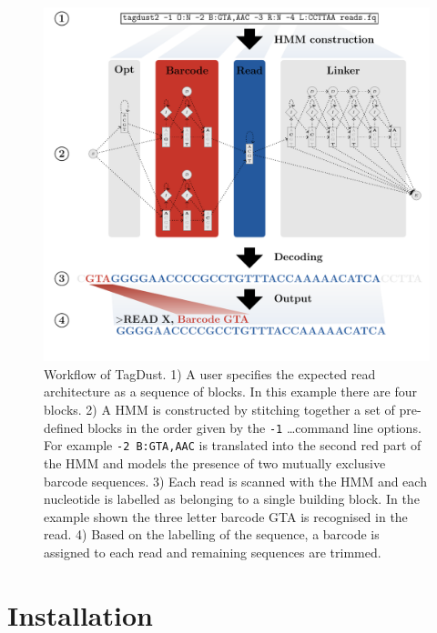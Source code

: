 \documentclass[11pt,a4paper,oneside]{book}
\begin{document}
\begin{figure}[H]

\begin{center}
\includegraphics[scale = 0.6]{Figure1.pdf}
\end{center}
\caption{Workflow of TagDust. 1) A user specifies the expected read architecture as a sequence of blocks. In this example there are four blocks. 2) A HMM is constructed by stitching together a set of pre-defined blocks in the order given by the {\tt -1} \dots command line options. For example {\tt -2 B:GTA,AAC} is translated into the second red part of the HMM and models the presence of two mutually exclusive barcode sequences. 3) Each read is scanned with the HMM and each nucleotide is labelled as belonging to a single building block. In the example shown the three letter barcode GTA is recognised in the read. 4) Based on the labelling of the sequence, a barcode is assigned to each read and remaining sequences are trimmed.}
\label{figure1}
\end{figure}



\newpage

\chapter{Installation}
\end{document}
